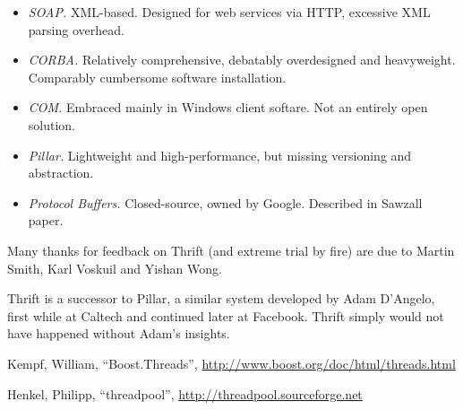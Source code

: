 \documentclass[nocopyrightspace,blockstyle]{sigplanconf}
\begin{document}
\begin{itemize}
\item \textit{SOAP.} XML-based. Designed for web services via HTTP, excessive
XML parsing overhead.
\item \textit{CORBA.} Relatively comprehensive, debatably overdesigned and
heavyweight. Comparably cumbersome software installation.
\item \textit{COM.} Embraced mainly in Windows client softare. Not an entirely
open solution.
\item \textit{Pillar.} Lightweight and high-performance, but missing versioning
and abstraction.
\item \textit{Protocol Buffers.} Closed-source, owned by Google. Described in
Sawzall paper.
\end{itemize}

\acks

Many thanks for feedback on Thrift (and extreme trial by fire) are due to
Martin Smith, Karl Voskuil and Yishan Wong.

Thrift is a successor to Pillar, a similar system developed
by Adam D'Angelo, first while at Caltech and continued later at Facebook.
Thrift simply would not have happened without Adam's insights.

\begin{thebibliography}{}

Kempf, William,
``Boost.Threads'',
\url{http://www.boost.org/doc/html/threads.html}

Henkel, Philipp,
``threadpool'',
\url{http://threadpool.sourceforge.net}

\end{thebibliography}
\end{document}
